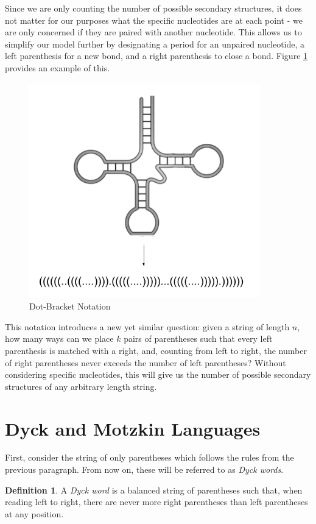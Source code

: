 \documentclass[11pt]{amsart}
\theoremstyle{plain}%
\theoremstyle{definition}
\newtheorem{defin}[thm]{{Definition}}
\theoremstyle{remark}
\numberwithin{equation}{thm}
\begin{document}
Since we are only counting the number of possible secondary structures, it does not matter for our purposes what the specific nucleotides are at each point - we are only concerned if they are paired with another nucleotide. This allows us to simplify our model further by designating a period for an unpaired nucleotide, a left parenthesis for a new bond, and a right parenthesis to close a bond. Figure \ref{fig:dotbracketnotation} provides an example of this.

\begin{figure}[htp]
    \centering
    \includegraphics[width=10cm]{2Dto1D.png}
    \caption{Dot-Bracket Notation}
    \label{fig:dotbracketnotation}
\end{figure}

This notation introduces a new yet similar question: given a string of length $n$, how many ways can we place $k$ pairs of parentheses such that every left parenthesis is matched with a right, and, counting from left to right, the number of right parentheses never exceeds the number of left parentheses? Without considering specific nucleotides, this will give us the number of possible secondary structures of any arbitrary length string.

\section{Dyck and Motzkin Languages}

First, consider the string of only parentheses which follows the rules from the previous paragraph. From now on, these will be referred to as \textit{Dyck words}.

\begin{defin}
    A \textit{Dyck word} is a balanced string of parentheses such that, when reading left to right, there are never more right parentheses than left parentheses at any position.
\end{defin}
\end{document}
